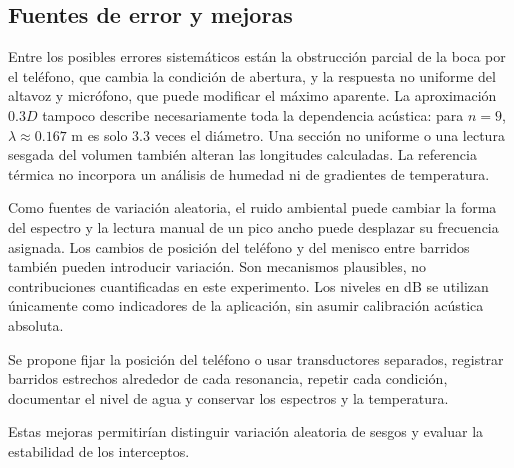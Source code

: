 \subsection{Fuentes de error y mejoras}
Entre los posibles errores sistemáticos están la obstrucción parcial de la boca por el teléfono, que cambia la condición de abertura, y la respuesta no uniforme del altavoz y micrófono, que puede modificar el máximo aparente. La aproximación $0.3D$ tampoco describe necesariamente toda la dependencia acústica: para $n=9$, $\lambda\approx0.167$ m es solo 3.3 veces el diámetro. Una sección no uniforme o una lectura sesgada del volumen también alteran las longitudes calculadas. La referencia térmica no incorpora un análisis de humedad ni de gradientes de temperatura.

Como fuentes de variación aleatoria, el ruido ambiental puede cambiar la forma del espectro y la lectura manual de un pico ancho puede desplazar su frecuencia asignada. Los cambios de posición del teléfono y del menisco entre barridos también pueden introducir variación. Son mecanismos plausibles, no contribuciones cuantificadas en este experimento. Los niveles en dB se utilizan únicamente como indicadores de la aplicación, sin asumir calibración acústica absoluta.

Se propone fijar la posición del teléfono o usar transductores separados, registrar barridos estrechos alrededor de cada resonancia, repetir cada condición, documentar el nivel de agua y conservar los espectros y la temperatura.

Estas mejoras permitirían distinguir variación aleatoria de sesgos y evaluar la estabilidad de los interceptos.
